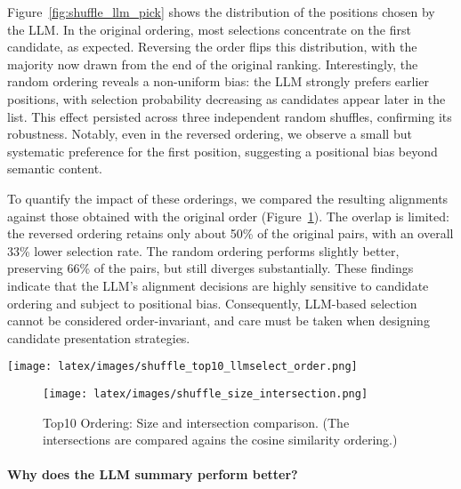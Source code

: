 \documentclass[11pt]{article}
\begin{document}
Figure~\ref{fig:shuffle_llm_pick} shows the distribution of the positions chosen by the LLM. In the original ordering, most selections concentrate on the first candidate, as expected. Reversing the order flips this distribution, with the majority now drawn from the end of the original ranking. Interestingly, the random ordering reveals a non-uniform bias: the LLM strongly prefers earlier positions, with selection probability decreasing as candidates appear later in the list. This effect persisted across three independent random shuffles, confirming its robustness. Notably, even in the reversed ordering, we observe a small but systematic preference for the first position, suggesting a positional bias beyond semantic content.

To quantify the impact of these orderings, we compared the resulting alignments against those obtained with the original order (Figure~\ref{fig:shuffle_size_intersect}). The overlap is limited: the reversed ordering retains only about 50\% of the original pairs, with an overall 33\% lower selection rate. The random ordering performs slightly better, preserving 66\% of the pairs, but still diverges substantially. These findings indicate that the LLM’s alignment decisions are highly sensitive to candidate ordering and subject to positional bias. Consequently, LLM-based selection cannot be considered order-invariant, and care must be taken when designing candidate presentation strategies.


\begin{figure*}[h] %
    \centering
    \texttt{[image: latex/images/shuffle\_top10\_llmselect\_order.png]}
    \vspace{-30px}
    \caption{LLM pick index frequency based on different orderings of the Top10 entities.}
    \label{fig:shuffle_llm_pick}
\end{figure*}


\begin{figure}[h]
    \texttt{[image: latex/images/shuffle\_size\_intersection.png]}
    \vspace{-30px}
    \caption{Top10 Ordering: Size and intersection comparison. (The intersections are compared agains the cosine similarity ordering.)}
    \label{fig:shuffle_size_intersect}
\end{figure}


\paragraph{Why does the LLM summary perform better?}
\end{document}
